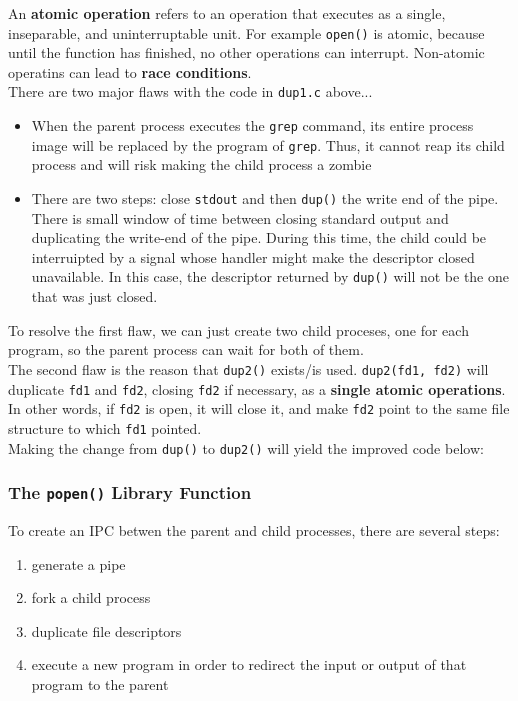 \documentclass{article}
\newcommand{\bold}[1]{\textbf{#1}}
\renewcommand{\b}{\item[$\circ$]}
\newcommand{\newlist}{\begin{itemize}}
\renewcommand{\endlist}{\end{itemize}}
\newcommand{\code}[1]{\texttt{#1}}
\begin{document}


An \bold{atomic operation} refers to an operation that executes as a single, inseparable, and uninterruptable unit. For example \code{open()} is atomic, because until the function has finished, no other operations can interrupt. Non-atomic operatins can lead to \bold{race conditions}. \\ 

There are two major flaws with the code in \code{dup1.c} above...

\newlist 
\b When the parent process executes the \code{grep} command, its entire process image will be replaced by the program of \code{grep}. Thus, it cannot reap its child process and will risk making the child process a zombie
\b There are two steps: close \code{stdout} and then \code{dup()} the write end of the pipe. There is small window of time between closing standard output and duplicating the write-end of the pipe. During this time, the child could be interruipted by a signal whose handler might make the descriptor closed unavailable. In this case, the descriptor returned by \code{dup()} will not be the one that was just closed. 
\endlist 

To resolve the first flaw, we can just create two child proceses, one for each program, so the parent process can wait for both of them. \\ 

The second flaw is the reason that \code{dup2()} exists/is used. \code{dup2(fd1, fd2)} will duplicate \code{fd1} and \code{fd2}, closing \code{fd2} if necessary, as a \bold{single atomic operations}. In other words, if \code{fd2} is open, it will close it, and make \code{fd2} point to the same file structure to which \code{fd1} pointed. \\ 

Making the change from \code{dup()} to \code{dup2()} will yield the improved code below:



\subsubsection{The \code{popen()} Library Function}

To create an IPC betwen the parent and child processes, there are several steps:

\begin{enumerate}
    \item generate a pipe
    \item fork a child process
    \item duplicate file descriptors
    \item execute a new program in order to redirect the input or output of that program to the parent
\end{enumerate}
\end{document}
